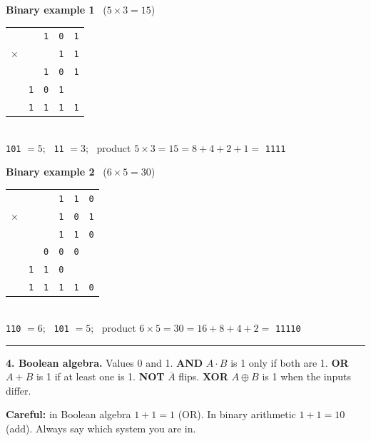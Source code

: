 \documentclass[10pt,letterpaper]{article}
\begin{document}
\textbf{Binary example 1} \ ($5\times3=15$)\\[2pt]
{\large\begin{tabular}{@{}r>{\centering\arraybackslash}p{0.78cm}>{\centering\arraybackslash}p{0.78cm}>{\centering\arraybackslash}p{0.78cm}>{\centering\arraybackslash}p{0.78cm}@{}}
 &  & \texttt{1} & \texttt{0} & \texttt{1}\\
$\times$ &  &  & \texttt{1} & \texttt{1}\\\hline
 &  & \texttt{1} & \texttt{0} & \texttt{1}\hfill\gc{}\\
 & \texttt{1} & \texttt{0} & \texttt{1} & \hfill\gc{}\\\hline
 & \texttt{1} & \texttt{1} & \texttt{1} & \texttt{1}
\end{tabular}}\\[1pt]
{\small \texttt{101} $=5$; \ \texttt{11} $=3$; \ product $5\times3=15=8+4+2+1=$ \texttt{1111}}

\textbf{Binary example 2} \ ($6\times5=30$)\\[2pt]
{\large\begin{tabular}{@{}r>{\centering\arraybackslash}p{0.78cm}>{\centering\arraybackslash}p{0.78cm}>{\centering\arraybackslash}p{0.78cm}>{\centering\arraybackslash}p{0.78cm}>{\centering\arraybackslash}p{0.78cm}@{}}
 &  &  & \texttt{1} & \texttt{1} & \texttt{0}\\
$\times$ &  &  & \texttt{1} & \texttt{0} & \texttt{1}\\\hline
 &  &  & \texttt{1} & \texttt{1} & \texttt{0}\hfill\gc{}\\
 &  & \texttt{0} & \texttt{0} & \texttt{0} & \hfill\gc{}\\
 & \texttt{1} & \texttt{1} & \texttt{0} &  & \hfill\gc{}\\\hline
 & \texttt{1} & \texttt{1} & \texttt{1} & \texttt{1} & \texttt{0}
\end{tabular}}\\[1pt]
{\small \texttt{110} $=6$; \ \texttt{101} $=5$; \ product $6\times5=30=16+8+4+2=$ \texttt{11110}}

\vspace{2pt}\rule{\textwidth}{0.3pt}

\textbf{4. Boolean algebra.} Values 0 and 1. \textbf{AND} $A\cdot B$ is 1 only if both are 1. \textbf{OR} $A+B$ is 1 if at least one is 1. \textbf{NOT} $\overline{A}$ flips. \textbf{XOR} $A\oplus B$ is 1 when the inputs differ.

\textbf{Careful:} in Boolean algebra $1+1=1$ (OR). In binary arithmetic $1+1=10$ (add). Always say which system you are in.
\end{document}
